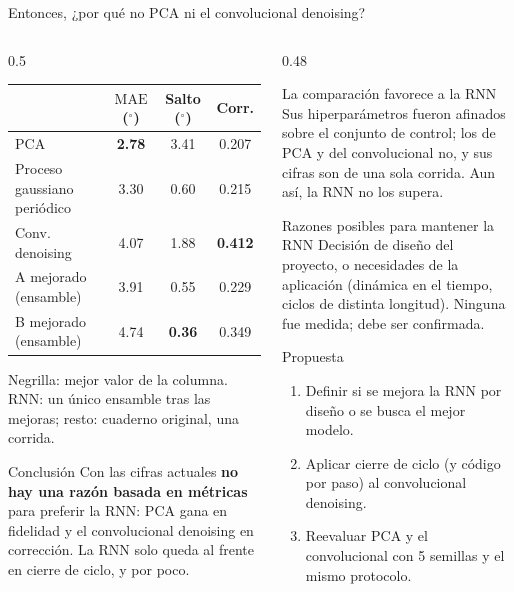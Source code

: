 \documentclass[aspectratio=169,10pt,t]{beamer}
\newcommand{\gr}{$^\circ$}
\newcommand{\mae}{\ensuremath{\mathrm{MAE}}}
\begin{document}
\begin{frame}{Entonces, ¿por qué no PCA ni el convolucional denoising?}
\begin{columns}[T]
\begin{column}{0.5\textwidth}
\footnotesize\setlength{\tabcolsep}{3pt}
\begin{tabular}{@{}lccc@{}}
\toprule
 & \textbf{\mae{} (\gr)} & \textbf{Salto (\gr)} & \textbf{Corr.}\\
\midrule
PCA & \textbf{2.78} & 3.41 & 0.207\\
Proceso gaussiano periódico & 3.30 & 0.60 & 0.215\\
Conv. denoising & 4.07 & 1.88 & \textbf{0.412}\\
\rowcolor{verdec}A mejorado (ensamble) & 3.91 & 0.55 & 0.229\\
\rowcolor{verdec}B mejorado (ensamble) & 4.74 & \textbf{0.36} & 0.349\\
\bottomrule
\end{tabular}

\vspace{3pt}
{\scriptsize Negrilla: mejor valor de la columna. RNN: un único ensamble tras las mejoras; resto: cuaderno original, una corrida.}

\vspace{4pt}
\begin{alertblock}{Conclusión}\small
Con las cifras actuales \textbf{no hay una razón basada en métricas} para preferir la RNN: PCA gana en fidelidad y el convolucional denoising en corrección. La RNN solo queda al frente en cierre de ciclo, y por poco.
\end{alertblock}
\end{column}
\begin{column}{0.48\textwidth}
\begin{block}{La comparación favorece a la RNN}\scriptsize
Sus hiperparámetros fueron afinados sobre el conjunto de control; los de PCA y del convolucional no, y sus cifras son de una sola corrida. Aun así, la RNN no los supera.
\end{block}
\begin{block}{Razones posibles para mantener la RNN}\scriptsize
Decisión de diseño del proyecto, o necesidades de la aplicación (dinámica en el tiempo, ciclos de distinta longitud). Ninguna fue medida; debe ser confirmada.
\end{block}
\begin{exampleblock}{Propuesta}\scriptsize
\begin{enumerate}\setlength{\itemsep}{1pt}
\item Definir si se mejora la RNN por diseño o se busca el mejor modelo.
\item Aplicar cierre de ciclo (y código por paso) al convolucional denoising.
\item Reevaluar PCA y el convolucional con 5 semillas y el mismo protocolo.
\end{enumerate}
\end{exampleblock}
\end{column}
\end{columns}
\end{frame}
\end{document}

